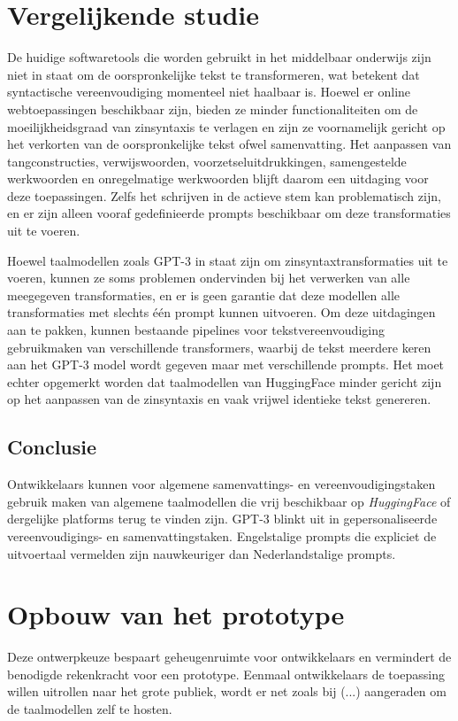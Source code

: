 \section{Vergelijkende studie}

De huidige softwaretools die worden gebruikt in het middelbaar onderwijs zijn niet in staat om de oorspronkelijke tekst te transformeren, wat betekent dat syntactische vereenvoudiging momenteel niet haalbaar is. Hoewel er online webtoepassingen beschikbaar zijn, bieden ze minder functionaliteiten om de moeilijkheidsgraad van zinsyntaxis te verlagen en zijn ze voornamelijk gericht op het verkorten van de oorspronkelijke tekst ofwel samenvatting. Het aanpassen van tangconstructies, verwijswoorden, voorzetseluitdrukkingen, samengestelde werkwoorden en onregelmatige werkwoorden blijft daarom een uitdaging voor deze toepassingen. Zelfs het schrijven in de actieve stem kan problematisch zijn, en er zijn alleen vooraf gedefinieerde prompts beschikbaar om deze transformaties uit te voeren.

\medspace

Hoewel taalmodellen zoals GPT-3 in staat zijn om zinsyntaxtransformaties uit te voeren, kunnen ze soms problemen ondervinden bij het verwerken van alle meegegeven transformaties, en er is geen garantie dat deze modellen alle transformaties met slechts één prompt kunnen uitvoeren. Om deze uitdagingen aan te pakken, kunnen bestaande pipelines voor tekstvereenvoudiging gebruikmaken van verschillende transformers, waarbij de tekst meerdere keren aan het GPT-3 model wordt gegeven maar met verschillende prompts. Het moet echter opgemerkt worden dat taalmodellen van HuggingFace minder gericht zijn op het aanpassen van de zinsyntaxis en vaak vrijwel identieke tekst genereren.

\medspace

\subsection{Conclusie}

Ontwikkelaars kunnen voor algemene samenvattings- en vereenvoudigingstaken gebruik maken van algemene taalmodellen die vrij beschikbaar op \textit{HuggingFace} of dergelijke platforms terug te vinden zijn. GPT-3 blinkt uit in gepersonaliseerde vereenvoudigings- en samenvattingstaken. Engelstalige prompts die expliciet de uitvoertaal vermelden zijn nauwkeuriger dan Nederlandstalige prompts. 

\section{Opbouw van het prototype}

Deze ontwerpkeuze bespaart geheugenruimte voor ontwikkelaars en vermindert de benodigde rekenkracht voor een prototype. Eenmaal ontwikkelaars de toepassing willen uitrollen naar het grote publiek, wordt er net zoals bij (...) aangeraden om de taalmodellen zelf te hosten.
